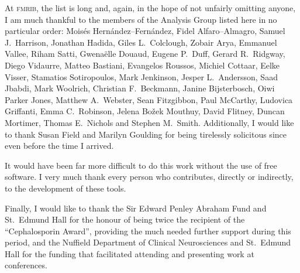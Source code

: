 \vspace{3mm}\noindent
At \textsc{fmrib}, the list is long and, again, in the hope of not unfairly omitting anyone, I am much thankful to the members of the Analysis Group listed here in no particular order: Mois{\'e}s Hern{\'a}ndez--Fern{\'a}ndez, Fidel Alfaro--Almagro, Samuel J.\ Harrison, Jonathan Hadida, Giles L.\ Colclough, Zobair Arya, Emmanuel Vallee, Riham Satti, Gwena\"{e}lle Douaud, Eugene P.\ Duff, Gerard R.\ Ridgway, Diego Vidaurre, Matteo Bastiani, Evangelos Roussos, Michiel Cottaar, Eelke Visser, Stamatios Sotiropoulos, Mark Jenkinson, Jesper L.\ Andersson, Saad Jbabdi, Mark Woolrich, Christian F.\ Beckmann, Janine Bijsterbosch, Oiwi Parker Jones, Matthew A.\ Webster, Sean Fitzgibbon, Paul McCarthy, Ludovica Griffanti, Emma C.\ Robinson, Jelena Bo\v{z}ek Mouthuy, David Flitney, Duncan Mortimer, Thomas E.\ Nichols and Stephen M.\ Smith. Additionally, I would like to thank Susan Field and Marilyn Goulding for being tirelessly solicitous since even before the time I arrived.

\vspace{3mm}\noindent
It would have been far more difficult to do this work without the use of free software. I very much thank every person who contributes, directly or indirectly, to the development of these tools.

\vspace{3mm}\noindent
Finally, I would like to thank the Sir Edward Penley Abraham Fund and St.\ Edmund Hall for the honour of being twice the recipient of the ``Cephalosporin Award'', providing the much needed further support during this period, and the Nuffield Department of Clinical Neurosciences and St.\ Edmund Hall for the funding that facilitated attending and presenting work at conferences.

